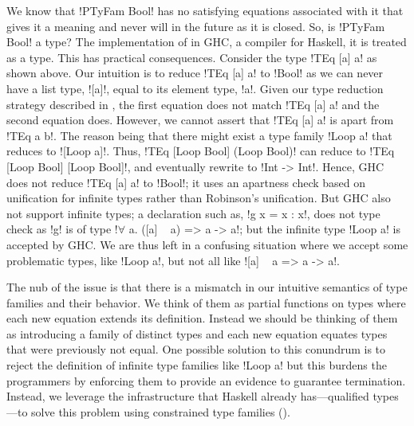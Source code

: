 \documentclass[format=acmsmall,manuscript,screen,nonacm,margin=1in,11pt]{acmart}
\begin{document}
We know that !PTyFam Bool! has no satisfying equations associated with it
that gives it a meaning and never will in the future
as it is closed. So, is !PTyFam Bool! a type? 
The implementation of \CLTF in GHC\cite{ghc_2020}, a compiler for Haskell,
it is treated as a type. This has practical consequences. Consider the type !TEq [a] a! as shown above.
Our intuition is to reduce !TEq [a] a! to !Bool! as we can never have a list type, ![a]!,
equal to its element type, !a!.
Given our type reduction strategy described in ,
the first equation does not match !TEq [a] a! and the second equation does.
However, we cannot assert that !TEq [a] a! is apart from !TEq a b!. 
The reason being that there might exist a type family !Loop a! that reduces to ![Loop a]!.
Thus, !TEq [Loop Bool] (Loop Bool)! can reduce to !TEq [Loop Bool] [Loop Bool]!, and eventually rewrite to !Int -> Int!.
Hence, GHC does not reduce !TEq [a] a! to !Bool!; it uses an apartness check based on unification for
infinite types\cite{jaffar_efficient_1984} rather than Robinson's unification.
But GHC also not support infinite types; a declaration such as,
!g x = x : x!, does not type check as !g! is of type !$\forall$ a. ([a] ~ a) => a -> a!;
but the infinite type !Loop a! is accepted by GHC. We are thus left in a confusing situation
where we accept some problematic types, like !Loop a!, but not all like ![a] ~ a => a -> a!.

The nub of the issue is that there is a mismatch in our intuitive semantics of type families and their behavior.
We think of them as partial functions on types where each new equation extends its definition.
Instead we should be thinking of them as introducing a family of distinct types and
each new equation equates types that were previously not equal.
One possible solution to this conundrum is to reject the definition of infinite type families
like !Loop a! but this burdens the programmers by enforcing them to provide an evidence
to guarantee termination. Instead, we leverage the infrastructure that Haskell already has---qualified
types---to solve this problem using constrained type families (\QLTF).


\end{document}
